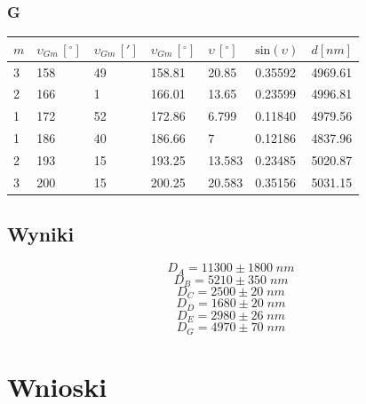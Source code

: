 \documentclass[a4paper, 11pt]{article}
\begin{document}
\subsubsection{G}\label{sec:g} %
\begin{center}
	\begin{tabular}{|l|l|l|l|l|l|l|}
		\hline
		$m $ & $\upsilon_{Gm} \, [^{\circ}]$ & $\upsilon_{Gm} \, [']$ & $\upsilon_{Gm} \, [^{\circ}]$ & $\upsilon \, [^{\circ}]$ & $\text{sin}(\upsilon)$ & $d [nm]$ \\ \hline
		3    & 158                           & 49                     & 158.81                        & 20.85                    & 0.35592                & 4969.61  \\ \hline
		2    & 166                           & 1                      & 166.01                        & 13.65                    & 0.23599                & 4996.81  \\ \hline
		1    & 172                           & 52                     & 172.86                        & 6.799                    & 0.11840                & 4979.56  \\ \hline
		1    & 186                           & 40                     & 186.66                        & 7                        & 0.12186                & 4837.96  \\ \hline
		2    & 193                           & 15                     & 193.25                        & 13.583                   & 0.23485                & 5020.87  \\ \hline
		3    & 200                           & 15                     & 200.25                        & 20.583                   & 0.35156                & 5031.15  \\ \hline
	\end{tabular}
\end{center}


\subsection{Wyniki}\label{sub:wyniki} %
\Large
\[
	D_A = 11300 \pm 1800 \; nm
\]
\[
	D_B = 5210 \pm 350 \; nm
\]
\[
	D_C = 2500 \pm 20 \; nm
\]
\[
	D_D = 1680 \pm 20 \; nm
\]
\[
	D_E = 2980 \pm 26 \; nm
\]
\[
	D_G = 4970 \pm 70 \; nm
\]
\normalsize


\section{Wnioski}\label{sec:wnioski} %

\end{document}

